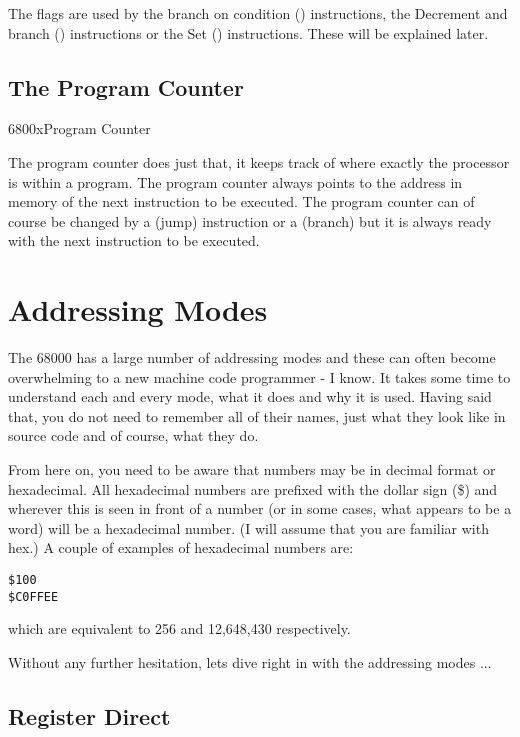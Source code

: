 The flags are used by the branch on condition ()
        instructions, the Decrement and branch () instructions or the Set
        () instructions. These will be explained later.

\subsection{The Program Counter}\mc6800x{Program Counter}

The program counter does just that, it keeps track of where
      exactly the processor is within a program. The program counter always
      points to the address in memory of the next instruction to be executed.
      The program counter can of course be changed by a  (jump) instruction
      or a  (branch) but it is always ready with the next instruction to be
      executed.

\section{Addressing Modes}
\label{ch1-addressing}%

The 68000 has a large number of addressing modes and these can often
    become overwhelming to a new machine code programmer -{} I know. It takes
    some time to understand each and every mode, what it does and why it is
    used. Having said that, you do not need to remember all of their names,
    just what they look like in source code and of course, what they
    do.

From here on, you need to be aware that numbers may be in decimal
    format or hexadecimal. All hexadecimal numbers are prefixed with the
    dollar sign (\$) and wherever this is seen in front of a number (or in some
    cases, what appears to be a word) will be a hexadecimal number. (I will
    assume that you are familiar with hex.) A couple of examples of
    hexadecimal numbers are:

\begin{lstlisting}[frame=none,numbers=none]
$100
$C0FFEE
\end{lstlisting}

which are equivalent to 256 and 12,648,430 respectively.

Without any further hesitation, lets dive right in with the
    addressing modes ...

\subsection{Register Direct}\address{Register Direct}

